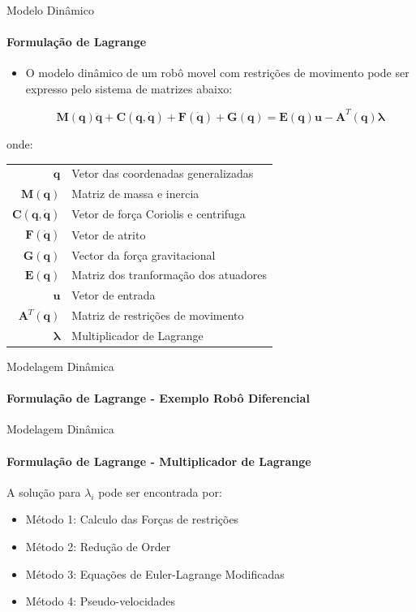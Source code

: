 \documentclass{beamer}
\newcommand{\cmark}{\textcolor{green}{\ding{51}}}%
\newcommand{\xmark}{\textcolor{red}{\ding{55}}}%
\begin{document}
\begin{frame}{Modelo Dinâmico}
    \framesubtitle{Formulação de Lagrange}
    \begin{itemize}
        \item O modelo dinâmico de um robô movel com restrições de movimento pode ser expresso pelo sistema de matrizes abaixo:

        \begin{equation}
            \mathbf{M(q)\ddot{q}+ C(q, \dot{q})+ F(\dot{q})+G(q) = E(q)u -A}^T\mathbf{(q)}\boldsymbol{\lambda}
        \end{equation}
    \end{itemize}

    \begin{block}{}
        \scriptsize{
            onde:
        \begin{tabular}{ r | l }
            $\mathbf{q}$& Vetor das coordenadas generalizadas\\ 
            $\mathbf{M(q)}$& Matriz de massa e inercia\\ 
            $\mathbf{C(q, \dot{q})}$& Vetor de força Coriolis e centrifuga\\ 
            $\mathbf{F(\dot{q})}$& Vetor de atrito\\ 
            $\mathbf{G(q)}$& Vector da força gravitacional\\ 
            $\mathbf{E(q)}$ & Matriz dos tranformação dos atuadores\\ 
            $\mathbf{u}$ & Vetor de entrada \\ 
            $\mathbf{A}^T\mathbf{(q)}$& Matriz de restrições de movimento\\ 
            $\boldsymbol{\lambda}$ & Multiplicador de Lagrange\\ 
        \end{tabular}}
    \end{block}
\end{frame}



\begin{frame}{Modelagem Dinâmica}
    \framesubtitle{Formulação de Lagrange - Exemplo Robô Diferencial}
\end{frame}


\begin{frame}{Modelagem Dinâmica}
    \framesubtitle{Formulação de Lagrange - Multiplicador de Lagrange}
        A solução para $\lambda_i$ pode ser encontrada por:
        \begin{itemize} 
            \item Método 1: Calculo das Forças de restrições \xmark
            \item Método 2: Redução de Order \xmark
            \item Método 3: Equações de Euler-Lagrange Modificadas \xmark
            \item Método 4: Pseudo-velocidades \cmark
        \end{itemize}
\end{frame}
\end{document}
